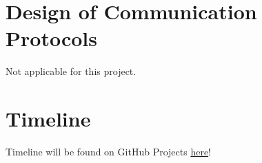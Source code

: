 \documentclass[12pt, titlepage]{article}
\begin{document}
\newpage

\section{Design of Communication Protocols}
Not applicable for this project.


\section{Timeline}

Timeline will be found on GitHub Projects \href{https://github.com/users/ausbennett/projects/3/views/6}{here}! 



%

\newpage{}
\end{document}
